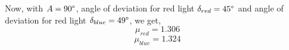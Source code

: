 \documentclass[twocolumn,11pt]{article}
\begin{document}

    
Now, with $A= 90\degree$, angle of deviation for red light $\delta_{red}= 45\degree$ and angle of deviation for red light $\delta_{blue} = 49 \degree$, we get,
\begin{equation}
    \label{red_refractive value}
    \mu_{red} = 1.306 
\end{equation}
\begin{equation}
    \label{violet_refractive value}
    \mu_{blue} =1.324 
\end{equation}
\end{document}
